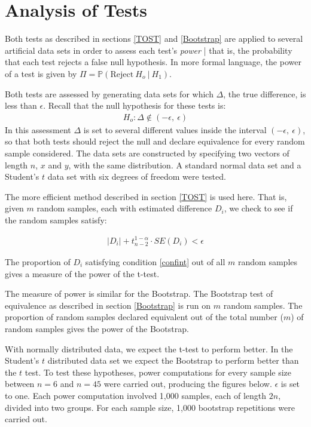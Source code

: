 \chapter{Analysis of Tests}
\label{Analysis}

Both tests as described in sections \ref{TOST} and \ref{Bootstrap} are applied to several artificial data sets in order to assess each test's \emph{power} | that is, the probability that each test rejects a false null hypothesis. In more formal language, the power of a test is given by $\Pi = \mathbb{P}(\mbox{Reject}\  H_o \  | \ H_1 )$.

Both tests are assessed by generating data sets for which $\Delta$, the true difference, is less than $\epsilon$. Recall that the null hypothesis for these tests is:
\begin{eqnarray}
H_o: \Delta \notin (-\epsilon, \  \epsilon)
\end{eqnarray}
In this assessment $\Delta$ is set to several different values inside the interval $(-\epsilon, \  \epsilon)$, so that both tests should reject the null and declare equivalence for every random sample considered. The data sets are constructed by specifying two vectors of length $n$, $x$ and $y$, with the same distribution. A standard normal data set and a Student's $t$ data set with six degrees of freedom were tested.

The more efficient method described in section \ref{TOST} is used here. That is, given $m$ random samples, each with estimated difference $D_i$, we check to see if the random samples satisfy:

\begin{eqnarray} 
\label{confint}
|D_i| + t^{1-\alpha}_{n-2} \cdot SE(D_i) < \epsilon
 \end{eqnarray}

The proportion of $D_i$ satisfying condition \ref{confint} out of all $m$ random samples gives a measure of the power of the t-test.

The measure of power is similar for the Bootstrap. The Bootstrap test of equivalence as described in section \ref{Bootstrap} is run on $m$ random samples. The proportion of random samples declared equivalent out of the total number ($m$) of random samples gives the power of the Bootstrap.

With normally distributed data, we expect the t-test to perform better. In the Student's $t$ distributed data set we expect the Bootstrap to perform better than the $t$ test. To test these hypotheses, power computations for every sample size between $n= 6$ and $n = 45$ were carried out, producing the figures below. $\epsilon$  is set to one. Each power computation involved 1,000 samples, each of length $2n$, divided into two groups. For each sample size, 1,000 bootstrap repetitions were carried out.
\pagebreak

